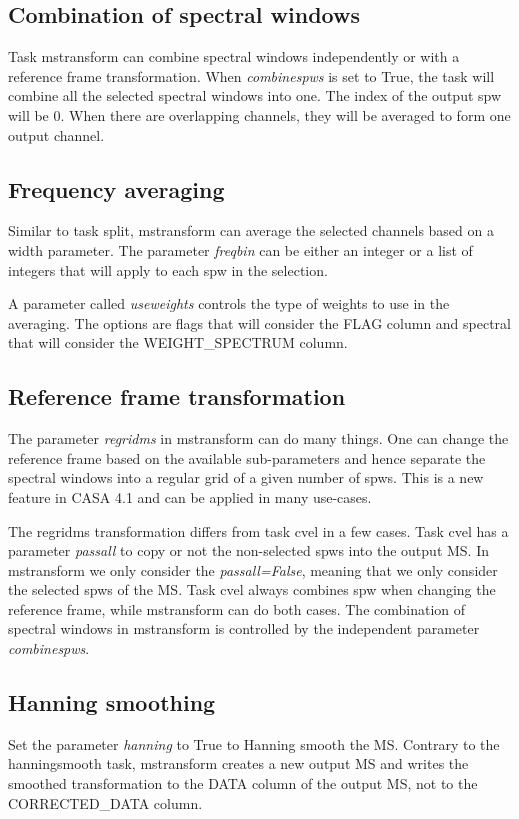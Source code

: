 
\subsection{Combination of spectral windows}
Task mstransform can combine spectral windows independently or
with a reference frame transformation. When {\it combinespws} is set to True, the task will
combine all the selected spectral windows into one. The index of the output spw
will be 0. When there are overlapping channels, they will be averaged to form one
output channel.

\subsection{Frequency averaging}
Similar to task split, mstransform can average the selected channels based on a
width parameter. The parameter {\it freqbin} can be either an integer or a list of
integers that will apply to each spw in the selection.

A parameter called {\it useweights} controls the type of weights to use in the
averaging. The options are flags that will consider the FLAG column and spectral
that will consider the WEIGHT_SPECTRUM column.


\subsection{Reference frame transformation}
The parameter {\it regridms} in mstransform can do many things. One can change the
reference frame based on the available sub-parameters and hence separate the spectral
windows into a regular grid of a given number of spws. This is a new feature in CASA
4.1 and can be applied in many use-cases. %

The regridms transformation differs from task cvel in a few cases. Task cvel has a
parameter {\it passall} to copy or not the non-selected spws into the output MS. In 
mstransform we only consider the {\it passall=False}, meaning that we only consider the
selected spws of the MS. Task cvel always combines spw when changing the reference
frame, while mstransform can do both cases. The combination of spectral windows in mstransform
is controlled by the independent parameter {\it combinespws}.

\subsection{Hanning smoothing}
Set the parameter {\it hanning} to True to Hanning smooth the MS. Contrary to the
hanningsmooth task, mstransform creates a new output MS and writes the smoothed transformation
to the DATA column of the output MS, not to the CORRECTED_DATA column.

